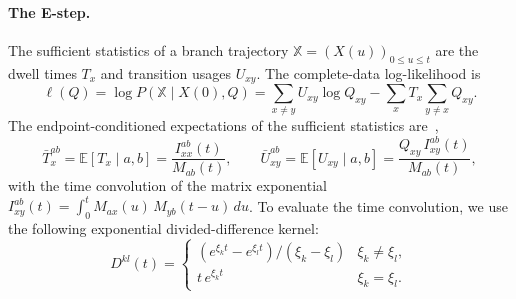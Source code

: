 \documentclass{article}
\newcommand{\E}{\mathbb{E}}
\begin{document}
\paragraph{The E-step.} The sufficient statistics of a branch
trajectory $\mathbb X=(X(u))_{0\le u\le t}$ are the dwell times $T_x$ and
transition usages $U_{xy}$. The complete-data log-likelihood is
\begin{equation}
\label{eq:cdl}
\ell(Q)=\log P(\mathbb X\mid X(0),Q)=\sum_{x\ne y}U_{xy}\log Q_{xy}
   -\sum_x T_x\!\!\sum_{y\ne x}\!Q_{xy}.
\end{equation}
The endpoint-conditioned expectations of the sufficient statistics are~\cite{HobolthJensen2005,HobolthJensen2011,HolmesRubin2002},
\begin{equation}
\label{eq:bridge}
\bar{T}_x^{ab} = \E[T_x\mid a,b]=\frac{I^{ab}_{xx}(t)}{M_{ab}(t)},\qquad
\bar{U}_{xy}^{ab} = \E[U_{xy}\mid a,b]=\frac{Q_{xy}\,I^{ab}_{xy}(t)}{M_{ab}(t)},
\end{equation}
with the time convolution of the matrix exponential $I^{ab}_{xy}(t)=\int_0^t M_{ax}(u)\,M_{yb}(t{-}u)\,du$.
To evaluate the time convolution, we use the following exponential divided-difference kernel:
\begin{equation}
\label{eq:bridgestat}
D^{kl}(t)=
\begin{cases}(e^{\xi_k t}-e^{\xi_l t})/(\xi_k-\xi_l)&\xi_k\ne\xi_l,\\[2pt]
t\,e^{\xi_k t}&\xi_k=\xi_l.\end{cases}
\end{equation}
\end{document}
